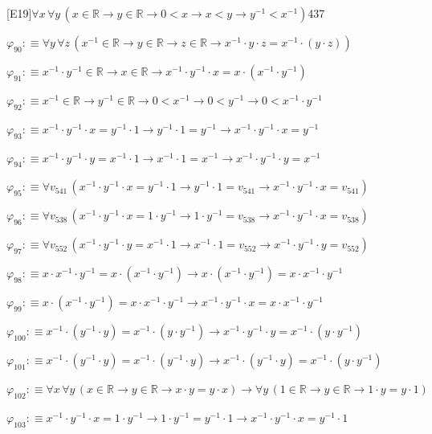 \begin{fullproof}{[E19]}{$\forall x\,\forall y\,(x \in \mathbb{R} \to y \in \mathbb{R} \to 0 < x \to x < y \to y^{-1} < x^{-1})$}{437}
\begin{abbrevlist}
\item $\varphi_{90} :\equiv \forall y\,\forall z\,(x^{-1} \in \mathbb{R} \to y \in \mathbb{R} \to z \in \mathbb{R} \to x^{-1} \cdot y \cdot z = x^{-1} \cdot (y \cdot z))$
\item $\varphi_{91} :\equiv x^{-1} \cdot y^{-1} \in \mathbb{R} \to x \in \mathbb{R} \to x^{-1} \cdot y^{-1} \cdot x = x \cdot (x^{-1} \cdot y^{-1})$
\item $\varphi_{92} :\equiv x^{-1} \in \mathbb{R} \to y^{-1} \in \mathbb{R} \to 0 < x^{-1} \to 0 < y^{-1} \to 0 < x^{-1} \cdot y^{-1}$
\item $\varphi_{93} :\equiv x^{-1} \cdot y^{-1} \cdot x = y^{-1} \cdot 1 \to y^{-1} \cdot 1 = y^{-1} \to x^{-1} \cdot y^{-1} \cdot x = y^{-1}$
\item $\varphi_{94} :\equiv x^{-1} \cdot y^{-1} \cdot y = x^{-1} \cdot 1 \to x^{-1} \cdot 1 = x^{-1} \to x^{-1} \cdot y^{-1} \cdot y = x^{-1}$
\item $\varphi_{95} :\equiv \forall v_{541}\,(x^{-1} \cdot y^{-1} \cdot x = y^{-1} \cdot 1 \to y^{-1} \cdot 1 = v_{541} \to x^{-1} \cdot y^{-1} \cdot x = v_{541})$
\item $\varphi_{96} :\equiv \forall v_{538}\,(x^{-1} \cdot y^{-1} \cdot x = 1 \cdot y^{-1} \to 1 \cdot y^{-1} = v_{538} \to x^{-1} \cdot y^{-1} \cdot x = v_{538})$
\item $\varphi_{97} :\equiv \forall v_{552}\,(x^{-1} \cdot y^{-1} \cdot y = x^{-1} \cdot 1 \to x^{-1} \cdot 1 = v_{552} \to x^{-1} \cdot y^{-1} \cdot y = v_{552})$
\item $\varphi_{98} :\equiv x \cdot x^{-1} \cdot y^{-1} = x \cdot (x^{-1} \cdot y^{-1}) \to x \cdot (x^{-1} \cdot y^{-1}) = x \cdot x^{-1} \cdot y^{-1}$
\item $\varphi_{99} :\equiv x \cdot (x^{-1} \cdot y^{-1}) = x \cdot x^{-1} \cdot y^{-1} \to x^{-1} \cdot y^{-1} \cdot x = x \cdot x^{-1} \cdot y^{-1}$
\item $\varphi_{100} :\equiv x^{-1} \cdot (y^{-1} \cdot y) = x^{-1} \cdot (y \cdot y^{-1}) \to x^{-1} \cdot y^{-1} \cdot y = x^{-1} \cdot (y \cdot y^{-1})$
\item $\varphi_{101} :\equiv x^{-1} \cdot (y^{-1} \cdot y) = x^{-1} \cdot (y^{-1} \cdot y) \to x^{-1} \cdot (y^{-1} \cdot y) = x^{-1} \cdot (y \cdot y^{-1})$
\item $\varphi_{102} :\equiv \forall x\,\forall y\,(x \in \mathbb{R} \to y \in \mathbb{R} \to x \cdot y = y \cdot x) \to \forall y\,(1 \in \mathbb{R} \to y \in \mathbb{R} \to 1 \cdot y = y \cdot 1)$
\item $\varphi_{103} :\equiv x^{-1} \cdot y^{-1} \cdot x = 1 \cdot y^{-1} \to 1 \cdot y^{-1} = y^{-1} \cdot 1 \to x^{-1} \cdot y^{-1} \cdot x = y^{-1} \cdot 1$

\end{abbrevlist}
\end{fullproof}
